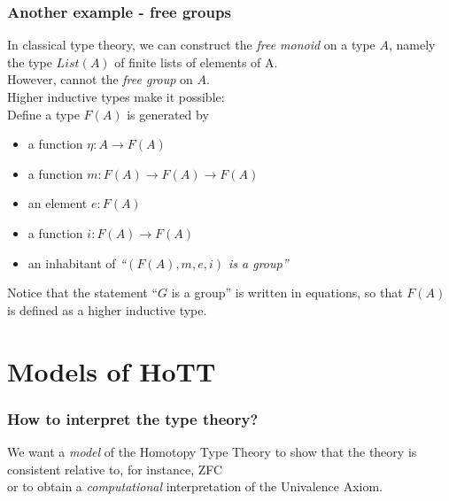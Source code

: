 \documentclass[dvipdfmx]{beamer}
\begin{document}
\begin{frame}
  \frametitle{Another example - free groups}
  In classical type theory,
  we can construct the {\it free monoid} on a type $A$,
  namely the type $List \left( A \right)$ of finite lists
  of elements of A.
  \\
  However, cannot the {\it free group} on $A$.
  \\
  Higher inductive types make it possible:
  \\
  Define a type $F \left( A \right)$ is generated by
  \begin{itemize}
    \item a function $\eta : A \to F \left( A \right)$
    \item a function $m : F \left( A \right) \to
      F \left( A \right) \to F \left( A \right)$
    \item an element $e : F \left( A \right)$
    \item a function $i : F \left( A \right) \to F \left( A \right)$
    \item an inhabitant of
      {\it ``$\left( F \left( A \right) , m , e , i \right)$ is a group''}
  \end{itemize}
  Notice that the statement ``$G$ is a group''
  is written in equations, so that
  $F \left( A \right)$ is defined as a higher inductive type.
\end{frame}

\section{Models of HoTT}

\begin{frame}
  \frametitle{How to interpret the type theory?}
  We want a {\it model} of the Homotopy Type Theory
  to show that the theory is consistent relative to,
  for instance, ZFC
  \\
  or
  to obtain a {\it computational} interpretation of
  the Univalence Axiom.\nocite{bezem_et_all:LIPIcs:20144628}
\end{frame}
\end{document}
